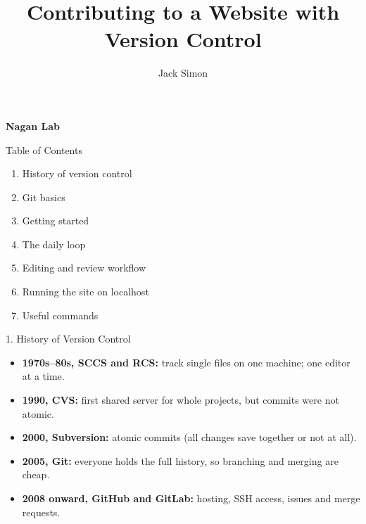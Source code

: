 \documentclass[aspectratio=169,11pt]{beamer}
\title{Contributing to a Website with Version Control}
\author{Jack Simon}
\date{}
\begin{document}
\begin{frame}[plain]
  \vfill
  \begin{flushleft}
    \vspace{0.8em}
    \begin{center}{\large\bfseries Nagan Lab}\end{center}
  \end{flushleft}
  \vfill
\end{frame}

\begin{frame}{Table of Contents}
  \bfseries
  \begin{enumerate}
    \setlength\itemsep{0.4em}
    \item History of version control
    \item Git basics
    \item Getting started
    \item The daily loop
    \item Editing and review workflow
    \item Running the site on localhost
    \item Useful commands
  \end{enumerate}
\end{frame}

\begin{frame}{1. History of Version Control}
  \small
  \begin{itemize}
    \setlength\itemsep{0.5em}
    \item \textbf{1970s--80s, SCCS and RCS:} track single files on one machine; one editor at a time.
    \item \textbf{1990, CVS:} first shared server for whole projects, but commits were not atomic.
    \item \textbf{2000, Subversion:} atomic commits (all changes save together or not at all).
    \item \textbf{2005, Git:} everyone holds the full history, so branching and merging are cheap.
    \item \textbf{2008 onward, GitHub and GitLab:} hosting, SSH access, issues and merge requests.
  \end{itemize}
\end{frame}
\end{document}
